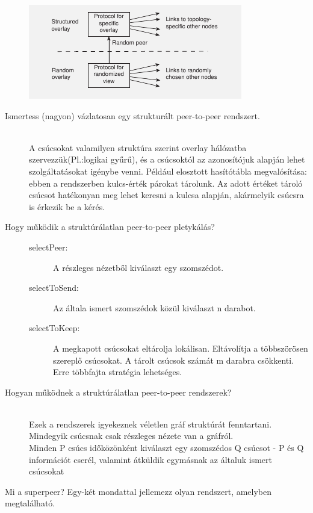 \documentclass[12pt]{article}
\begin{document}
\begin{description}
        \begin{center}
            \includegraphics[scale=0.9]{./images/overlayTop.png}
        \end{center}
    \item [Ismertess (nagyon) vázlatosan egy strukturált peer-to-peer rendszert.]
        \hfill \\
        A csúcsokat valamilyen struktúra szerint overlay hálózatba szervezzük(Pl.:logikai gyűrű), és a csúcsoktól az azonosítójuk alapján lehet szolgáltatásokat igénybe venni. Például elosztott hasítótábla megvalósítása: ebben a rendszerben kulcs-érték párokat tárolunk. Az adott értéket tároló csúcsot hatékonyan meg lehet keresni a kulcsa alapján, akármelyik csúcsra is érkezik be a kérés.
    \item [Hogy működik a struktúrálatlan peer-to-peer pletykálás?]
        \hfill
        \begin{description}
            \item [selectPeer:] A részleges nézetből kiválaszt egy szomszédot.
            \item [selectToSend:] Az általa ismert szomszédok közül kiválaszt n darabot.
            \item [selectToKeep:] A megkapott csúcsokat eltárolja lokálisan. Eltávolítja a többszörösen szereplő csúcsokat. A tárolt csúcsok számát m darabra csökkenti. Erre többfajta stratégia lehetséges.
        \end{description}
\item [Hogyan működnek a struktúrálatlan peer-to-peer rendszerek?]
    \hfill \\
    Ezek a rendszerek igyekeznek véletlen gráf struktúrát fenntartani. Mindegyik csúcsnak csak részleges nézete van a gráfról.\\Minden P csúcs időközönként kiválaszt egy szomszédos Q csúcsot - P és Q információt cserél, valamint átküldik egymásnak az általuk ismert csúcsokat
    \item [Mi a superpeer? Egy-két mondattal jellemezz olyan rendszert, amelyben megtalálható.]

\end{description}
\end{document}
